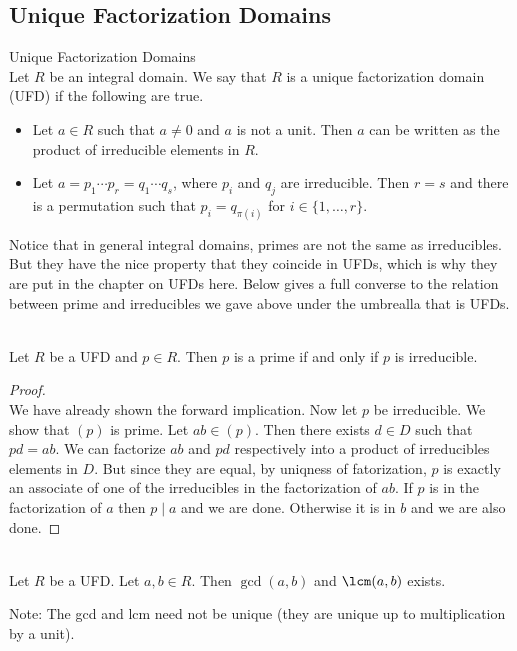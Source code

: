 \documentclass[a4paper]{article}
\begin{document}
\subsection{Unique Factorization Domains}
\begin{defn}{Unique Factorization Domains}{}\\
Let $R$ be an integral domain. We say that $R$ is a unique factorization domain (UFD) if the following are true. 
\begin{itemize}
\item Let $a\in R$ such that $a\neq 0$ and $a$ is not a unit. Then $a$ can be written as the product of irreducible elements in $R$. 
\item Let $a=p_1\cdots p_r=q_1\cdots q_s$, where $p_i$ and $q_j$ are irreducible. Then $r=s$ and there is a permutation such that $p_i=q_{\pi(i)}$ for $i\in\{1,\dots,r\}$. 
\end{itemize}
\end{defn}

Notice that in general integral domains, primes are not the same as irreducibles. But they have the nice property that they coincide in UFDs, which is why they are put in the chapter on UFDs here. Below gives a full converse to the relation between prime and irreducibles we gave above under the umbrealla that is UFDs. 

\begin{prp}{}{}\\
Let $R$ be a UFD and $p\in R$. Then $p$ is a prime if and only if $p$ is irreducible. 
\begin{proof}\\
We have already shown the forward implication. Now let $p$ be irreducible. We show that $(p)$ is prime. Let $ab\in(p)$. Then there exists $d\in D$ such that $pd=ab$. We can factorize $ab$ and $pd$ respectively into a product of irreducibles elements in $D$. But since they are equal, by uniqness of fatorization, $p$ is exactly an associate of one of the irreducibles in the factorization of $ab$. If $p$ is in the factorization of $a$ then $p\;|\;a$ and we are done. Otherwise it is in $b$ and we are also done. 
\end{proof}
\end{prp}

\begin{prp}{}{}\\
Let $R$ be a UFD. Let $a,b\in R$. Then $\gcd(a,b)$ and $\lcm(a,b)$ exists. 
\end{prp}

Note: The gcd and lcm need not be unique (they are unique up to multiplication by a unit). 
\end{document}
